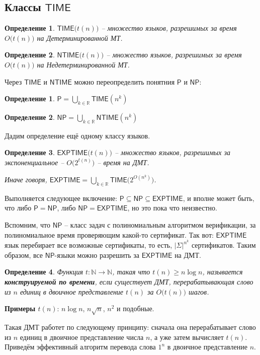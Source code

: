 \documentclass[a4paper,12pt]{article}
\newtheorem{definition}{Определение}
\newtheorem*{defin}{Определение}
\newcommand{\Pclass}{\mathsf{P}}
\newcommand{\NPclass}{\mathsf{NP}}
\newcommand{\Time}{\mathsf{TIME}}
\newcommand{\NTime}{\mathsf{NTIME}}
\newcommand{\ETime}{\mathsf{EXPTIME}}
\newcommand{\N}{\mathbb{N}}
\newcommand{\R}{\mathbb{R}}
\begin{document}
\subsection{Классы \(\Time\)}
\begin{definition}
    $\Time\big(t(n)\big)$ -- множество языков, разрешимых за время $O\big(t(n)\big)$ на Детерминированной МТ.
\end{definition}
\begin{definition}
    $\NTime\big(t(n)\big)$ -- множество языков, разрешимых за время $O\big(t(n)\big)$ на Недетерминированной МТ.
\end{definition}
Через $\Time$ и $\NTime$ можно переопределить понятния $\Pclass$ и $\NPclass$:
\begin{defin}
    $\Pclass = \bigcup\limits_{k \in \R}\Time(n^k)$
\end{defin}
\begin{defin}
    $\NPclass = \bigcup\limits_{k \in \R}\NTime(n^k)$
\end{defin}
Дадим определение ещё одному классу языков.
\begin{definition}
    $\ETime\big(t(n)\big)$ -- множество языков, разрешимых за экспоненциальное -- $O\big(2^{t(n)}\big)$ -- время на ДМТ.
    
    Иначе говоря, $\ETime = \bigcup\limits_{k \in \R}\Time\big(2^{O(n^k)}\big)$.
\end{definition}
Выполняется следующее включение: $\Pclass \subseteq \NPclass \subseteq \ETime$, и вполне может быть, что либо $\Pclass = \NPclass$, либо $\NPclass = \ETime$, но это пока что неизвестно.

Вспомним, что $\NPclass$ -- класс задач с полиномиальным алгоритмом верификации, за полиномиальное время проверяющим какой-то сертификат. Так вот: $\ETime$ язык перебирает все возможные сертификаты, то есть, $|\Sigma|^{n^k}$ сертификатов. Таким образом, все $\NPclass$-языки можно разрешить за $\ETime$ на ДМТ.

\begin{definition}
    Функция $t : \N \to \N$, такая что $t(n) \geq n \log n$, называется
\textbf{конструируемой по времени}, если существует ДМТ, перерабатывающая слово из $n$ единиц в двоичное представление $t(n)$ за $O\big(t(n)\big)$ шагов.
\end{definition}
\textbf{Примеры $t(n)$}: $n \log n$, $n\sqrt{n}$, $n^2$ и подобные.

Такая ДМТ работет по следующему принципу: сначала она перерабатывает слово из $n$ единиц в двоичное представление числа $n$, а уже затем вычисляет $t(n)$. Приведём эффективный алгоритм перевода слова $1^n$  в двоичное представление $n$.
\end{document}
